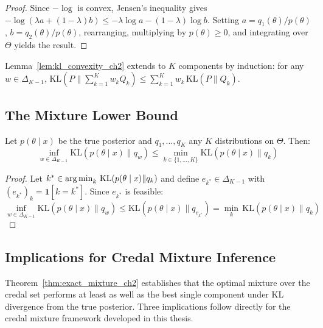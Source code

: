     \begin{proof}
    Since $-\log$ is convex, Jensen's inequality gives $-\log(\lambda a + (1-\lambda)b) \leq -\lambda \log a - (1-\lambda) \log b$. Setting $a = q_1(\theta)/p(\theta)$, $b = q_2(\theta)/p(\theta)$, rearranging, multiplying by $p(\theta) \geq 0$, and integrating over $\Theta$ yields the result.
    \end{proof}

    \begin{remark}
    Lemma~\ref{lem:kl_convexity_ch2} extends to $K$ components by induction: for any $w \in \Delta_{K-1}$, $\mathrm{KL}(P \| \sum_{k=1}^K w_k Q_k) \leq \sum_{k=1}^K w_k\, \mathrm{KL}(P \| Q_k)$.
    \end{remark}

    \subsection{The Mixture Lower Bound}

    \begin{theorem}
    \label{thm:exact_mixture_ch2}
    Let $p(\theta \mid x)$ be the true posterior and $q_1, \ldots, q_K$ any $K$ distributions on $\Theta$. Then:
    \begin{equation}
        \inf_{w \in \Delta_{K-1}} \mathrm{KL}(p(\theta \mid x) \| q_w) \leq \min_{k \in \{1,\ldots,K\}} \mathrm{KL}(p(\theta \mid x) \| q_k)
    \end{equation}
    \end{theorem}

    \begin{proof}
    Let $k^* \in \operatorname*{arg\,min}_k\, \mathrm{KL}(p(\theta \mid x) \| q_k)$ and define $e_{k^*} \in \Delta_{K-1}$ with $(e_{k^*})_k = \mathbf{1}[k = k^*]$. Since $e_{k^*}$ is feasible:
    \begin{equation}
        \inf_{w \in \Delta_{K-1}} \mathrm{KL}(p(\theta \mid x) \| q_w) \leq \mathrm{KL}(p(\theta \mid x) \| q_{e_{k^*}}) = \min_k\, \mathrm{KL}(p(\theta \mid x) \| q_k)
    \end{equation}
    \end{proof}

    \subsection{Implications for Credal Mixture Inference}

    Theorem~\ref{thm:exact_mixture_ch2} establishes that the optimal mixture over the credal set performs at least as well as the best single component under KL divergence from the true posterior. Three implications follow directly for the credal mixture framework developed in this thesis.

